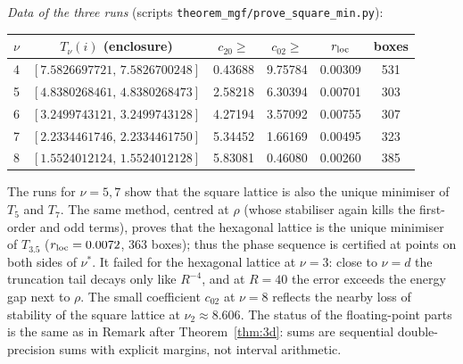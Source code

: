 \documentclass[11pt,a4paper]{amsart}
\theoremstyle{definition}
\begin{document}
\noindent\emph{Data of the three runs} (scripts \texttt{theorem\_mgf/prove\_square\_min.py}): 
\begin{center}\small
\begin{tabular}{cccccc}\toprule
$\nu$ & $T_\nu(i)$ (enclosure) & $c_{20}\ge$ & $c_{02}\ge$ & $r_{\rm loc}$ & boxes\\\midrule
4 & $[7.5826697721,\,7.5826700248]$ & 0.43688 & 9.75784 & 0.00309 & 531\\
5 & $[4.8380268461,\,4.8380268473]$ & 2.58218 & 6.30394 & 0.00701 & 303\\
6 & $[3.2499743121,\,3.2499743128]$ & 4.27194 & 3.57092 & 0.00755 & 307\\
7 & $[2.2334461746,\,2.2334461750]$ & 5.34452 & 1.66169 & 0.00495 & 323\\
8 & $[1.5524012124,\,1.5524012128]$ & 5.83081 & 0.46080 & 0.00260 & 385\\\bottomrule
\end{tabular}\end{center}
The runs for $\nu=5,7$ show that the square lattice is also the unique minimiser of $T_5$ and $T_7$. The same method, centred at $\rho$ (whose stabiliser again kills the first-order and odd terms), proves that the hexagonal lattice is the unique minimiser of $T_{3.5}$ ($r_{\rm loc}=0.0072$, 363 boxes); thus the phase sequence is certified at points on both sides of $\nu^*$. It failed for the hexagonal lattice at $\nu=3$: close to $\nu=d$ the truncation tail decays only like $R^{-4}$, and at $R=40$ the error exceeds the energy gap next to $\rho$. The small coefficient $c_{02}$ at $\nu=8$ reflects the nearby loss of stability of the square lattice at $\nu_2\approx8.606$.
The status of the floating-point parts is the same as in Remark after Theorem~\ref{thm:3d}: sums are sequential double-precision sums with explicit margins, not interval arithmetic.
\end{document}
